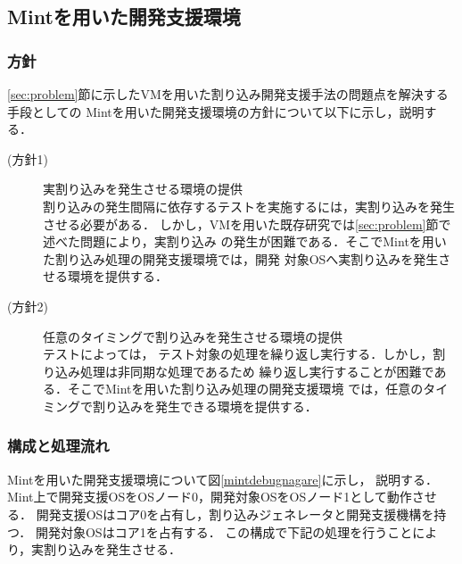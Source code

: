 \documentclass[submit,techreq,noauthor,dvipdfmx]{ipsj}
\begin{document}
\subsection{Mintを用いた開発支援環境}\label{sec:debugging_support_mechanism_with_Mint}

\subsubsection{方針}\label{sec:policy}

\ref{sec:problem}節に示したVMを用いた割り込み開発支援手法の問題点を解決する手段としての
Mintを用いた開発支援環境の方針について以下に示し，説明する．
\begin{description}
    \item[(方針1)] 実割り込みを発生させる環境の提供\\
        割り込みの発生間隔に依存するテストを実施するには，実割り込みを発生させる必要がある．
        しかし，VMを用いた既存研究では\ref{sec:problem}節で述べた問題により，実割り込み
        の発生が困難である．そこでMintを用いた割り込み処理の開発支援環境では，開発
        対象OSへ実割り込みを発生させる環境を提供する．
    \item[(方針2)] 任意のタイミングで割り込みを発生させる環境の提供\\
        テストによっては，
        テスト対象の処理を繰り返し実行する．しかし，割り込み処理は非同期な処理であるため
        繰り返し実行することが困難である．そこでMintを用いた割り込み処理の開発支援環境
        では，任意のタイミングで割り込みを発生できる環境を提供する．
\end{description}

\subsubsection{構成と処理流れ}\label{sec:structure_and_processing_flow}


Mintを用いた開発支援環境について図\ref{mintdebugnagare}に示し，
説明する．
Mint上で開発支援OSをOSノード0，開発対象OSをOSノード1として動作させる．
開発支援OSはコア0を占有し，割り込みジェネレータと開発支援機構を持つ．
開発対象OSはコア1を占有する．
この構成で下記の処理を行うことにより，実割り込みを発生させる．
\end{document}
